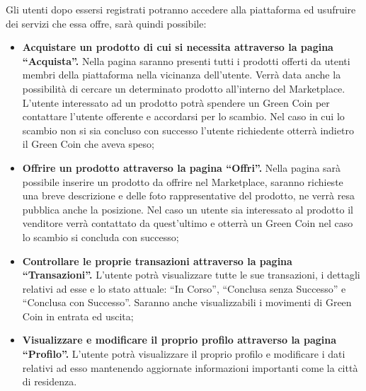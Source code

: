 Gli utenti dopo essersi registrati potranno accedere alla piattaforma ed usufruire dei servizi che essa offre, sarà quindi possibile:  
\begin{itemize}
    \item \textbf{Acquistare un prodotto di cui si necessita attraverso la pagina “Acquista”.} Nella pagina saranno presenti tutti i prodotti offerti da utenti membri della piattaforma nella vicinanza dell'utente. Verrà data anche la possibilità di cercare un determinato prodotto all'interno del Marketplace. L'utente interessato ad un prodotto potrà spendere un Green Coin per contattare l'utente offerente e accordarsi per lo scambio. Nel caso in cui lo scambio non si sia concluso con successo l'utente richiedente otterrà indietro il Green Coin che aveva speso;
    \item \textbf{Offrire un prodotto attraverso la pagina “Offri”.} Nella pagina sarà possibile inserire un prodotto da offrire nel Marketplace, saranno richieste una breve descrizione e delle foto rappresentative del prodotto, ne verrà resa pubblica anche la posizione. Nel caso un utente sia interessato al prodotto il venditore verrà contattato da quest'ultimo e otterrà un Green Coin nel caso lo scambio si concluda con successo;
    \item \textbf{Controllare le proprie transazioni attraverso la pagina “Transazioni”.} L'utente potrà visualizzare tutte le sue transazioni, i dettagli relativi ad esse e lo stato attuale: “In Corso”, “Conclusa senza Successo” e “Conclusa con Successo”. Saranno anche visualizzabili i movimenti di Green Coin in entrata ed uscita;
    \item \textbf{Visualizzare e modificare il proprio profilo attraverso la pagina “Profilo”.} L'utente potrà visualizzare il proprio profilo e modificare i dati relativi ad esso mantenendo aggiornate informazioni importanti come la città di residenza.
\end{itemize}